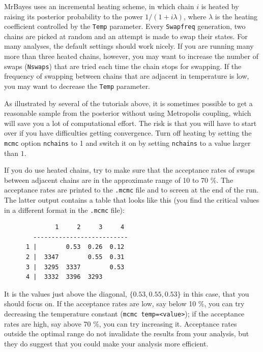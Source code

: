 \documentclass[12pt]{book}
\newcommand{\ttt}[1]{\texttt{#1}}
\begin{document}
MrBayes uses an incremental heating scheme, in which chain $i$ is heated by raising its posterior
probability to the power $1/ (1 + i\lambda)$, where $\lambda$ is the heating coefficient controlled
by the \ttt{Temp} parameter. Every \ttt{Swapfreq} generation, two chains are picked at random and
an attempt is made to swap their states. For many analyses, the default settings should work
nicely. If you are running many more than three heated chains, however, you may want to increase
the number of swaps (\ttt{Nswaps}) that are tried each time the chain stops for swapping. If the
frequency of swapping between chains that are adjacent in temperature is low, you may want to
decrease the \ttt{Temp} parameter.

As illustrated by several of the tutorials above, it is sometimes possible to get a reasonable
sample from the posterior without using Metropolis coupling, which will save you a lot of
computational effort. The risk is that you will have to start over if you have difficulties getting
convergence. Turn off heating by setting the \ttt{mcmc} option \ttt{nchains} to 1 and switch it on
by setting \ttt{nchains} to a value larger than $1$.

If you do use heated chains, try to make sure that the acceptance rates of swaps between adjacent
chains are in the approximate range of 10 to 70 \%. The acceptance rates are printed to the
\ttt{.mcmc} file and to screen at the end of the run. The latter output contains a table that looks
like this (you find the critical values in a different format in the \ttt{.mcmc} file):

\footnotesize
\begin{singlespacing}
\begin{verbatim}
              1     2     3     4 
        --------------------------
      1 |        0.53  0.26  0.12 
      2 |  3347        0.55  0.31 
      3 |  3295  3337        0.53 
      4 |  3332  3396  3293       
\end{verbatim}
\end{singlespacing}
\normalsize

It is the values just above the diagonal, $\{0.53, 0.55, 0.53\}$ in this case, that you should
focus on. If the acceptance rates are low, say below 10 \%, you can try decreasing the temperature
constant (\ttt{mcmc temp=<value>}); if the acceptance rates are high, say above 70 \%, you can try
increasing it. Acceptance rates outside the optimal range do not invalidate the results from your
analysis, but they do suggest that you could make your analysis more efficient.
\end{document}
